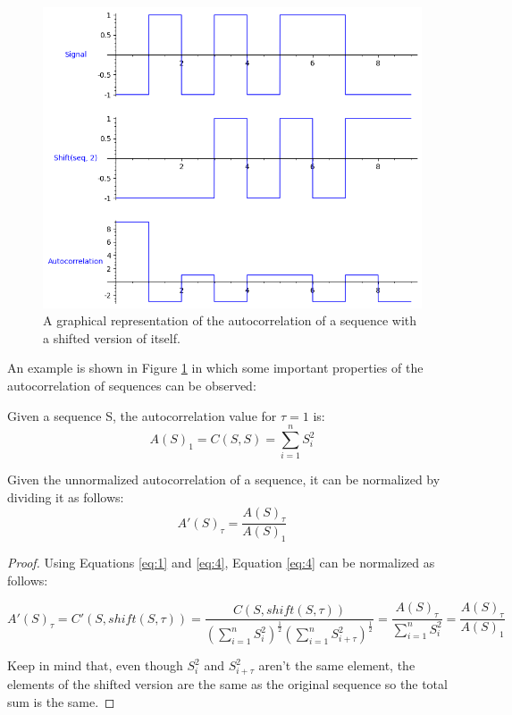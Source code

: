 \begin{figure}[ht!] %
\begin{center}
\includegraphics[width=0.7\linewidth]{Chapters/Introduction/signals_autocorrelation}
\end{center}
\caption{A graphical representation of the autocorrelation of a sequence with  a shifted version of itself.}
\label{introduction_signals_autocorrelation}
\end{figure}

An example  is shown in Figure
\ref{introduction_signals_autocorrelation} in which some important properties of
the autocorrelation of sequences can be observed:

\begin{theorem}\label{theorem:1.2.1}
  Given a sequence S, the autocorrelation value for $\tau = 1$ is:
    \begin{equation}
      A(S)_{1}=C(S, S)=\sum_{i=1}^{n}S_{i}^2
    \end{equation}
\end{theorem}

\begin{corollary}
  Given the unnormalized autocorrelation of a sequence, it can be normalized
  by dividing it as follows:
  \begin{equation}
    A'(S)_{\tau} = \frac{A(S)_{\tau}}{A(S)_{1}}
  \end{equation}
\end{corollary}

\begin{proof}
  Using Equations \eqref{eq:1} and \eqref{eq:4}, Equation \eqref{eq:4} can be
  normalized as follows:

    $$A'(S)_{\tau} = C'(S, shift(S, \tau)) = \frac{C(S, shift(S, \tau))}{(\sum_{i=1}^{n} S_{i}^{2})^{\frac{1}{2}}(\sum_{i=1}^{n} S_{i+\tau}^{2})^\frac{1}{2}} = \frac{A(S)_{\tau}}{\sum_{i=1}^{n} S_{i}^{2}} = \frac{A(S)_{\tau}}{A(S)_{1}}$$

  Keep in mind that, even though $S_{i}^2$ and $S_{i+\tau}^2$ aren't the same
  element, the elements of the shifted version are the same as the original
  sequence so the total sum is the same.
\end{proof}

